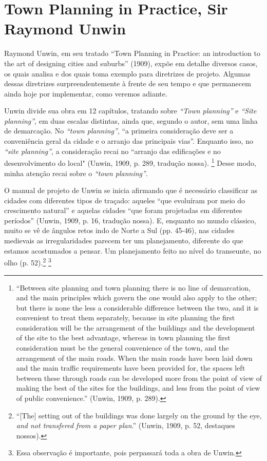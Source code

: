 \documentclass[12pt, a4paper]{book} %
\begin{document}
            \section{Town Planning in Practice, Sir Raymond Unwin}
        
        Raymond Unwin, em seu tratado ``Town Planning in Practice: an introduction to the art of designing cities and suburbs'' (1909), expõe em detalhe diversos casos, os quais analisa e dos quais toma exemplo para diretrizes de projeto. Algumas dessas diretrizes surpreendentemente à frente de seu tempo e que permanecem ainda hoje por implementar, como veremos adiante. 

        Unwin divide sua obra em 12 capítulos, tratando sobre \textit{``Town planning''} e \textit{``Site planning''}, em duas escalas distintas, ainda que, segundo o autor, sem uma linha de demarcação. No \textit{``town planning''}, ``a primeira consideração deve ser a conveniência geral da cidade e o arranjo das principais vias''. Enquanto isso, no \textit{``site planning''}, a consideração recai no ``arranjo das edificações e no desenvolvimento do local" (Unwin, 1909, p. 289, tradução nossa). 
            \footnote[2]{``Between site planning and town planning there is no line of demarcation, and the main principles which govern the one would also apply to the other; but there is none the less a considerable difference between the two, and it is convenient to treat them separately, because in site planning the first consideration will be the arrangement of the buildings and the development of the site to the best advantage, whereas in town planning the first consideration must be the general convenience of the town, and the arrangement of the main roads. When the main roads have been laid down and the main traffic requirements have been provided for, the spaces left between these through roads can be developed more from the point of view of making the best of the sites for the buildings, and less from the point of view of public convenience.'' (Unwin, 1909, p. 289).} 
        Desse modo, minha atenção recai sobre o \textit{``town planning''}.

        O manual de projeto de Unwin se inicia afirmando que é necessário classificar as cidades com diferentes tipos de traçado: aqueles ``que evoluíram por meio do crescimento natural'' e aquelas cidades ``que foram projetadas em diferentes períodos'' (Unwin, 1909, p. 16, tradução nossa). E, enquanto no mundo clássico, muito se vê de ângulos retos indo de Norte a Sul (pp. 45-46), nas cidades medievais as irregularidades parecem ter um planejamento, diferente do que estamos acostumados a pensar. Um planejamento feito no nível do transeunte, no olho (p. 52).\footnote[3]{``[The] setting out of the buildings was done largely on the ground by the eye, \textit{and not transfered from a paper plan}.'' (Unwin, 1909, p. 52, destaques nossos).}
        \footnote[4]{Essa observação é importante, pois perpassará toda a obra de Unwin.}
\end{document}
